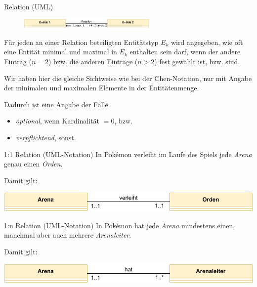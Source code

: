 \begin{defi}{Relation (UML)}
    \begin{figure}
        \begin{center}
            \includegraphics[width=0.6\textwidth]{includes/figures/definition_uml_relation.pdf}
        \end{center}
    \end{figure}
    Für jeden an einer Relation beteiligten Entitätstyp $E_k$ wird angegeben, wie oft eine Entität minimal und maximal in $E_k$ enthalten sein darf, wenn der andere Eintrag ($n=2$) bzw. die anderen Einträge ($n>2$) fest gewählt ist, bzw. sind.

    Wir haben hier die gleiche Sichtweise wie bei der Chen-Notation, nur mit Angabe der minimalen und maximalen Elemente in der Entitätenmenge.

    Dadurch ist eine Angabe der Fälle
    \begin{itemize}
        \item \emph{optional}, wenn Kardinalität $= 0$, bzw.
        \item \emph{verpflichtend}, sonst.
    \end{itemize}
\end{defi}

\begin{example}{1:1 Relation (UML-Notation)}
    In Pokémon verleiht im Laufe des Spiels jede \emph{Arena} genau einen \emph{Orden}.

    Damit gilt:
    \begin{center}
        \includegraphics[width=0.7\linewidth]{includes/figures/example_entity_relationship_modell_uml_one_to_one.pdf}
    \end{center}
\end{example}

\begin{example}{1:n Relation (UML-Notation)}
    In Pokémon hat jede \emph{Arena} mindestens einen, manchmal aber auch mehrere \emph{Arenaleiter}.

    Damit gilt:
    \begin{center}
        \includegraphics[width=0.7\linewidth]{includes/figures/example_entity_relationship_modell_uml_one_to_many.pdf}
    \end{center}
\end{example}

